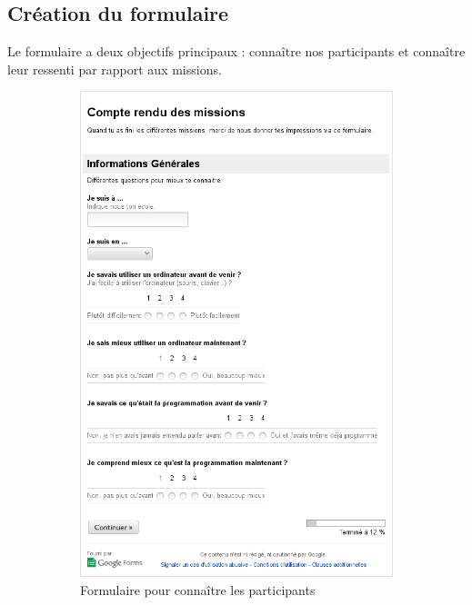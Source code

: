\subsection{Création du formulaire}
Le formulaire a deux objectifs principaux : connaître nos participants et connaître leur ressenti par rapport aux \glspl{mission}.
\begin{figure}%
  \begin{center}
    \begin{subfigure}[b]{.49\textwidth}
      \includegraphics[width=\textwidth]{content/8-validation/images/form-user}
      \caption{Formulaire pour connaître les participants}
    \end{subfigure}
    \begin{subfigure}[b]{.49\textwidth}

\end{subfigure}
\end{center}
\end{figure}
